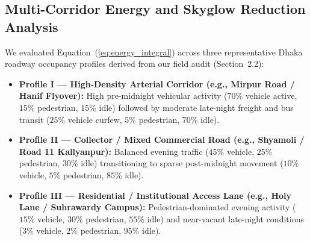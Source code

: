 \documentclass[11pt,a4paper]{article}
\begin{document}
\subsection{Multi-Corridor Energy and Skyglow Reduction Analysis}
We evaluated Equation~(\ref{eq:energy_integral}) across three representative Dhaka roadway occupancy profiles derived from our field audit (Section~2.2):
\begin{itemize}
    \item \textbf{Profile I --- High-Density Arterial Corridor (e.g., Mirpur Road / Hanif Flyover):} High pre-midnight vehicular activity (\(70\%\) vehicle active, \(15\%\) pedestrian, \(15\%\) idle) followed by moderate late-night freight and bus transit (\(25\%\) vehicle curfew, \(5\%\) pedestrian, \(70\%\) idle).
    \item \textbf{Profile II --- Collector / Mixed Commercial Road (e.g., Shyamoli / Road 11 Kallyanpur):} Balanced evening traffic (\(45\%\) vehicle, \(25\%\) pedestrian, \(30\%\) idle) transitioning to sparse post-midnight movement (\(10\%\) vehicle, \(5\%\) pedestrian, \(85\%\) idle).
    \item \textbf{Profile III --- Residential / Institutional Access Lane (e.g., Holy Lane / Suhrawardy Campus):} Pedestrian-dominated evening activity (\(15\%\) vehicle, \(30\%\) pedestrian, \(55\%\) idle) and near-vacant late-night conditions (\(3\%\) vehicle, \(2\%\) pedestrian, \(95\%\) idle).
\end{itemize}
\end{document}
